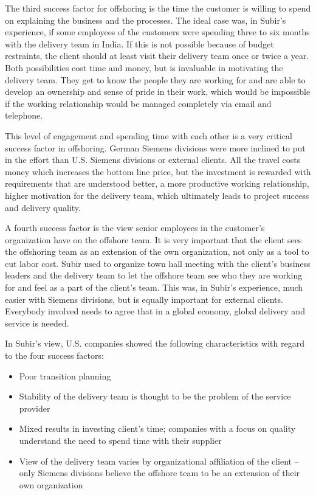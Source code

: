 The third success factor for offshoring is the time the customer is willing to spend on explaining the business and the processes. The ideal case was, in Subir's experience, if some employees of the customers were spending three to six months with the delivery team in India. If this is not possible because of budget restraints, the client should at least visit their delivery team once or twice a year. Both possibilities cost time and money, but is invaluable in motivating the delivery team. They get to know the people they are working for and are able to develop an ownership and sense of pride in their work, which would be impossible if the working relationship would be managed completely via email and telephone.

This level of engagement and spending time with each other is a very critical success factor in offshoring. German Siemens divisions were more inclined to put in the effort than U.S. Siemens divisions or external clients. All the travel costs money which increases the bottom line price, but the investment is rewarded with requirements that are understood better, a more productive working relationship, higher motivation for the delivery team, which ultimately leads to project success and delivery quality.

A fourth success factor is the view senior employees in the customer's organization have on the offshore team. It is very important that the client sees the offshoring team as an extension of the own organization, not only as a tool to cut labor cost. Subir used to organize town hall meeting with the client's business leaders and the delivery team to let the offshore team see who they are working for and feel as a part of the client's team. This was, in Subir's experience, much easier with Siemens divisions, but is equally important for external clients. Everybody involved needs to agree that in a global economy, global delivery and service is needed.

In Subir's view, U.S. companies showed the following characteristics with regard to the four success factors:

\begin{itemize}
	\item Poor transition planning
	\item Stability of the delivery team is thought to be the problem of the service provider
	\item Mixed results in investing client's time; companies with a focus on quality understand the need to spend time with their supplier
	\item View of the delivery team varies by organizational affiliation of the client -- only Siemens divisions believe the offshore team to be an extension of their own organization
\end{itemize}



